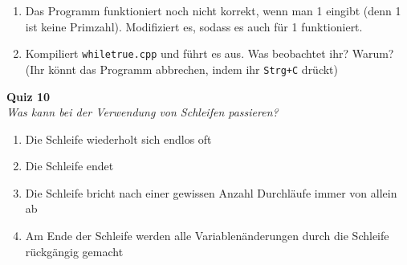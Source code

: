 \begin{spiel}
      \begin{enumerate}
            \item Das Programm funktioniert noch nicht korrekt, wenn man 1 eingibt
                  (denn 1 ist keine Primzahl). Modifiziert es, sodass es auch für 1
                  funktioniert.
            \item Kompiliert \texttt{whiletrue.cpp} und führt es aus. Was beobachtet
                  ihr? Warum? (Ihr könnt das Programm abbrechen, indem ihr
                  \texttt{Strg+C} drückt)
      \end{enumerate}
      

\end{spiel}

\textbf{Quiz 10}\\
\textit{Was kann bei der Verwendung von Schleifen passieren?}
\begin{enumerate}[label=\alph*)]
    \item Die Schleife wiederholt sich endlos oft
    \item Die Schleife endet
    \item Die Schleife bricht nach einer gewissen Anzahl Durchläufe immer von allein ab
    \item Am Ende der Schleife werden alle Variablenänderungen durch die Schleife rückgängig gemacht
\end{enumerate}

